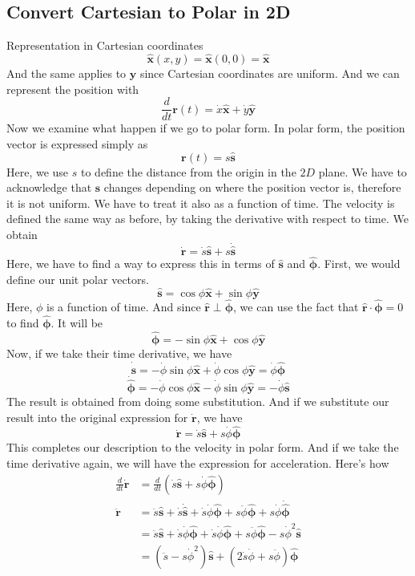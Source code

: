 \documentclass[12pt]{article}
\newcommand{\dydx}[2]{\frac{d #1}{d #2}}
\newcommand{\paren}[1]{\left( #1 \right)}
\newcommand{\unx}{\hat{\mathbf{x}}}
\newcommand{\uny}{\hat{\mathbf{y}}}
\newcommand{\uns}{\hat{\mathbf{s}}}
\newcommand{\unr}{\hat{\mathbf{r}}}
\newcommand{\unphi}{\hat{\boldsymbol\phi}}
\begin{document}
\subsection{Convert Cartesian to Polar in 2D}
Representation in Cartesian coordinates
\[
\unx(x,y)=\unx(0,0)=\unx
\]
And the same applies to $\uny$ since Cartesian coordinates are uniform. And we can represent the position with
\[
\dydx{}{t}\mathbf{r}(t) = \Dot{x}\unx+\Dot{y}\uny
\]
Now we examine what happen if we go to polar form. In polar form, the position vector is expressed simply as
\[
\mathbf{r}(t) = s\uns
\]
Here, we use $s$ to define the distance from the origin in the $2D$ plane. We have to acknowledge that $\uns$ changes depending on where the position vector is, therefore it is not uniform. We have to treat it also as a function of time. The velocity is defined the same way as before, by taking the derivative with respect to time. We obtain 
\[
\Dot{\mathbf{r}} = \Dot{s}\uns + s\Dot{\uns} 
\]
Here, we have to find a way to express this in terms of $\uns$ and $\unphi$. First, we would define our unit polar vectors.
\[
\uns = \cos\phi\unx + \sin\phi\uny
\]
Here, $\phi$ is a function of time. And since $\unr \perp \unphi$, we can use the fact that $\unr \cdot \unphi = 0$ to find $\unphi$. It will be
\[
\unphi = -\sin\phi\unx + \cos\phi\uny
\]
Now, if we take their time derivative, we have
\[
\Dot{\uns} = -\Dot{\phi}\sin\phi\unx + \Dot{\phi}\cos\phi\uny = \Dot{\phi}\unphi
\]
\[
\Dot{\unphi} = -\Dot{\phi}\cos\phi\unx - \Dot{\phi}\sin\phi\uny = - \Dot{\phi}\uns
\]
The result is obtained from doing some substitution. And if we substitute our result into the original expression for $\Dot{\mathbf{r}}$, we have
\[
\Dot{\mathbf{r}} = \Dot{s}\uns + s\Dot{\phi}\unphi
\]
This completes our description to the velocity in polar form. And if we take the time derivative again, we will have the expression for acceleration. Here's how
\begin{align*}
    \dydx{}{t}\Dot{\mathbf{r}} &= \dydx{}{t}\paren{\Dot{s}\uns + s\Dot{\phi}\unphi} \\
    \ddot{\mathbf{r}} &= \ddot{s}\uns + \dot{s}\dot{\uns} + \dot{s}\Dot{\phi}\unphi + s\ddot{\phi}\unphi + s\Dot{\phi}\dot{\unphi}\\
                      &= \ddot{s}\uns + \dot{s}\dot{\phi}\unphi + \dot{s}\dot{\phi}\unphi + s\ddot{\phi}\unphi -  s\Dot{\phi}^2\uns\\
                      &= \paren{\ddot{s}-s\dot{\phi}^2}\uns + \paren{2\dot{s}\dot{\phi}+s\ddot{\phi}}\unphi
\end{align*}
\end{document}
